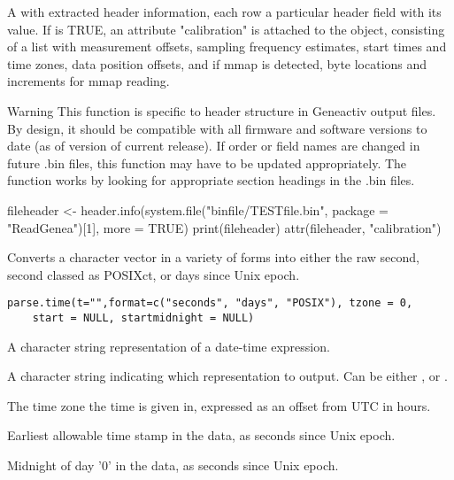 \documentclass[a4paper]{book}
\begin{document}
%
\begin{Value}
A  with extracted header information, each row a particular header field with its value. 
If  is TRUE, an attribute "calibration" is attached to the object, consisting of a list with measurement offsets, sampling frequency estimates, start times and time zones, data position offsets, and if mmap is detected, byte locations and increments for mmap reading.
\end{Value}
%
\begin{Section}{Warning}
This function is specific to header structure in Geneactiv output files. By design, it should be compatible with all firmware and software versions to date (as of version of current release). If order or field names are changed in future .bin files, this function may have to be updated appropriately.
The function works by looking for appropriate section headings in the .bin files.
\end{Section}
%
\begin{SeeAlso}\relax
{}
\end{SeeAlso}
%
\begin{Examples}
\begin{ExampleCode}

fileheader <- header.info(system.file("binfile/TESTfile.bin", package = "ReadGenea")[1], more = TRUE)
print(fileheader)
attr(fileheader, "calibration")
\end{ExampleCode}
\end{Examples}
%
\begin{Description}\relax
Converts a character vector in a variety of forms into either the raw second, second classed as POSIXct, or days since Unix epoch.
\end{Description}
%
\begin{Usage}
\begin{verbatim}
parse.time(t="",format=c("seconds", "days", "POSIX"), tzone = 0, 
	start = NULL, startmidnight = NULL)
\end{verbatim}
\end{Usage}
%
\begin{Arguments}
\begin{ldescription}
\item[\code{t}] A character string representation of a date-time expression.
\item[\code{format}] A character string indicating which representation to output.  Can be either ,  or .
\item[\code{tzone}] The time zone the time is given in, expressed as an offset from UTC in hours.
\item[\code{start}] Earliest allowable time stamp in the data, as seconds since Unix epoch.
\item[\code{startmidnight}] Midnight of day '0' in the data, as seconds since Unix epoch.
\end{ldescription}
\end{Arguments}
\end{document}
